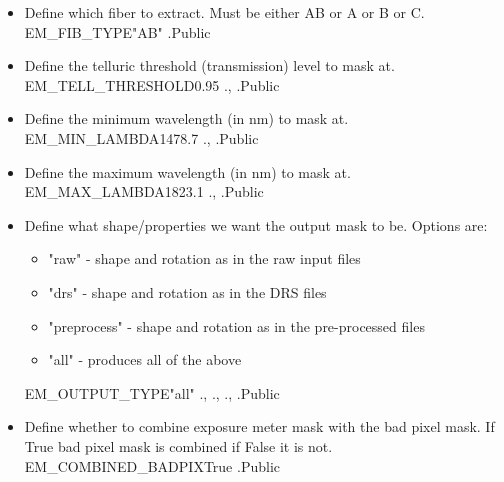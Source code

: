 \begin{itemize}

\item {} 
{Define which fiber to extract. Must be either AB or A or B or C.}
{EM\_FIB\_TYPE}{"AB"}
{\calexometer}{\constantsfile}{\calexometer.\progMAIN}{Public}

\item {} 
{Define the telluric threshold (transmission) level to mask at.}
{EM\_TELL\_THRESHOLD}{0.95}
{\calexometer}{\constantsfile}{\calexometer.\progMAIN, \spirouExposeMeter.}{Public}

\item {} 
{Define the minimum wavelength (in nm) to mask at.}
{EM\_MIN\_LAMBDA}{1478.7}
{\calexometer}{\constantsfile}{\calexometer.\progMAIN, \spirouExposeMeter.}{Public}

\item {} 
{Define the maximum wavelength (in nm) to mask at.}
{EM\_MAX\_LAMBDA}{1823.1}
{\calexometer}{\constantsfile}{\calexometer.\progMAIN, \spirouExposeMeter.}{Public}

\item {} 
{Define what shape/properties we want the output mask to be. Options are:
\begin{itemize}
	\item "raw" - shape and rotation as in the raw input files
	\item "drs" - shape and rotation as in the DRS files
	\item "preprocess" - shape and rotation as in the pre-processed files
	\item "all" - produces all of the above
\end{itemize}
}
{EM\_OUTPUT\_TYPE}{"all"}
{\calexometer}{\constantsfile}{\calexometer.\progMAIN, \spirouCONST., \spirouCONST., \spirouCONST.}{Public}


\item {} 
{Define whether to combine exposure meter mask with the bad pixel mask. If True bad pixel mask is combined if False it is not.}
{EM\_COMBINED\_BADPIX}{True}
{\calexometer}{\constantsfile}{\calexometer.\progMAIN}{Public}


\end{itemize}
